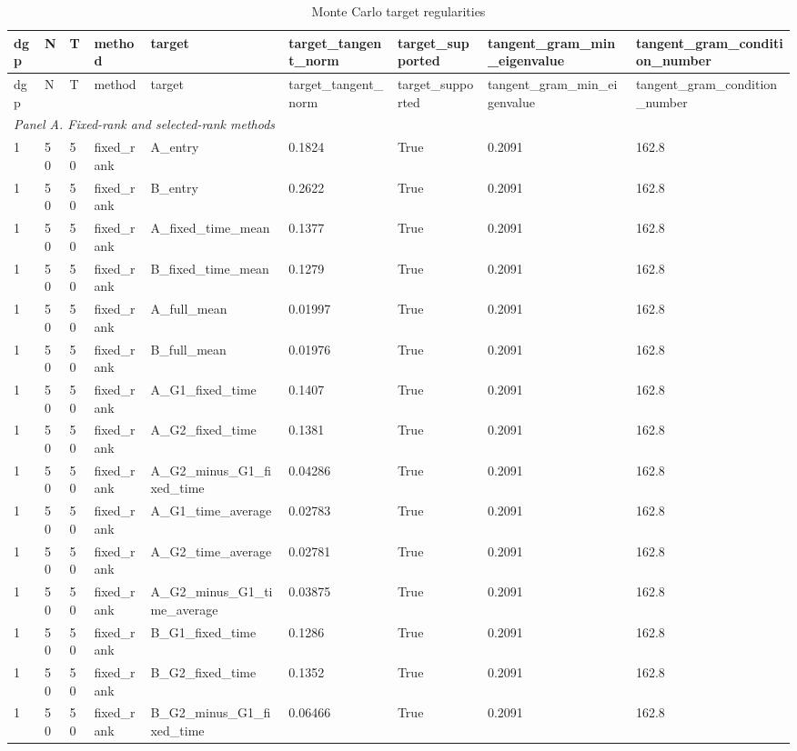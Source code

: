 \begingroup
\small
\begin{longtable}{lllllllll}
\caption{Monte Carlo target regularities}\label{tab:mc-target-regularities}\\
\toprule
dgp & N & T & method & target & target\_tangent\_norm & target\_supported & tangent\_gram\_min\_eigenvalue & tangent\_gram\_condition\_number \\
\midrule
\endfirsthead
\toprule
dgp & N & T & method & target & target\_tangent\_norm & target\_supported & tangent\_gram\_min\_eigenvalue & tangent\_gram\_condition\_number \\
\midrule
\endhead
\multicolumn{9}{l}{\textit{Panel A. Fixed-rank and selected-rank methods}} \\
1 & 50 & 50 & fixed\_rank & A\_entry & 0.1824 & True & 0.2091 & 162.8 \\
1 & 50 & 50 & fixed\_rank & B\_entry & 0.2622 & True & 0.2091 & 162.8 \\
1 & 50 & 50 & fixed\_rank & A\_fixed\_time\_mean & 0.1377 & True & 0.2091 & 162.8 \\
1 & 50 & 50 & fixed\_rank & B\_fixed\_time\_mean & 0.1279 & True & 0.2091 & 162.8 \\
1 & 50 & 50 & fixed\_rank & A\_full\_mean & 0.01997 & True & 0.2091 & 162.8 \\
1 & 50 & 50 & fixed\_rank & B\_full\_mean & 0.01976 & True & 0.2091 & 162.8 \\
1 & 50 & 50 & fixed\_rank & A\_G1\_fixed\_time & 0.1407 & True & 0.2091 & 162.8 \\
1 & 50 & 50 & fixed\_rank & A\_G2\_fixed\_time & 0.1381 & True & 0.2091 & 162.8 \\
1 & 50 & 50 & fixed\_rank & A\_G2\_minus\_G1\_fixed\_time & 0.04286 & True & 0.2091 & 162.8 \\
1 & 50 & 50 & fixed\_rank & A\_G1\_time\_average & 0.02783 & True & 0.2091 & 162.8 \\
1 & 50 & 50 & fixed\_rank & A\_G2\_time\_average & 0.02781 & True & 0.2091 & 162.8 \\
1 & 50 & 50 & fixed\_rank & A\_G2\_minus\_G1\_time\_average & 0.03875 & True & 0.2091 & 162.8 \\
1 & 50 & 50 & fixed\_rank & B\_G1\_fixed\_time & 0.1286 & True & 0.2091 & 162.8 \\
1 & 50 & 50 & fixed\_rank & B\_G2\_fixed\_time & 0.1352 & True & 0.2091 & 162.8 \\
1 & 50 & 50 & fixed\_rank & B\_G2\_minus\_G1\_fixed\_time & 0.06466 & True & 0.2091 & 162.8 \\

\end{longtable}
